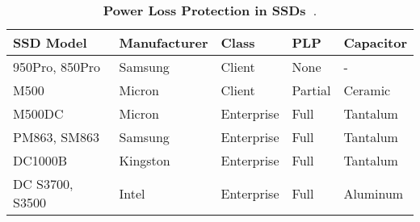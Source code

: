 \begin{table}[b]
    \centering
    \fontsize{11}{11}
    \small
    \begin{tabular}{|l|l|l|l|l|}
        \hline
        \footnotesize{\bf{SSD Model}} &
        \footnotesize{\bf{Manufacturer}} & 
        \footnotesize{\bf{Class}} &
        \footnotesize{\bf{PLP}} & 
        \footnotesize{\bf{Capacitor}} \\ \hline \hline

        \footnotesize{950Pro, 850Pro} & \footnotesize{Samsung} & \footnotesize{Client} & \footnotesize{None} & - \\ \hline
        \footnotesize{M500} & \footnotesize{Micron} & \footnotesize{Client} & \footnotesize{Partial} & \footnotesize{Ceramic} \\ \hline
        \footnotesize{M500DC} & \footnotesize{Micron} & \footnotesize{Enterprise} & \footnotesize{Full} & \footnotesize{Tantalum} \\ \hline
        \footnotesize{PM863, SM863} & \footnotesize{Samsung} & \footnotesize{Enterprise} & \footnotesize{Full} & \footnotesize{Tantalum} \\ \hline
        \footnotesize{DC1000B} & \footnotesize{Kingston} & \footnotesize{Enterprise} & \footnotesize{Full} & \footnotesize{Tantalum} \\ \hline
        \footnotesize{DC S3700, S3500} & \footnotesize{Intel} & \footnotesize{Enterprise} & \footnotesize{Full} & \footnotesize{Aluminum} \\ \hline
    \end{tabular}
    \caption{\textbf{Power Loss Protection in SSDs~\cite{micron2014, intel2014, samsungplp2016}}.}
    \label{ssd_plp}
    \vspace{-20pt}  
\end{table}
\iffalse
\textcolor{red}{
As opposed to a memory pressure, the negative impact of data loss is equally serious for both data. Because an SSD writes the associated LPN (Logical Page Number) in the OOB (Out-of-band) area of the physical page, it is virtually possible to recover the up-to-date mapping table by scanning the entire NAND flash memory. However, because it takes prohibitively long, particularly for the scalable SSDs, PLP-SSD snapshots an entire mapping table into the specific area in NAND flash in a power loss and loads it into DRAM at a reboot. The user data also offers no alternative but for PLP as it cannot be recovered after a crash. For the PLP-SSD, the host system ensures reliability assuming that all acknowledged data survive a power outage, and thus, the loss of user data can lead to a catastrophic result.
}
\fi


